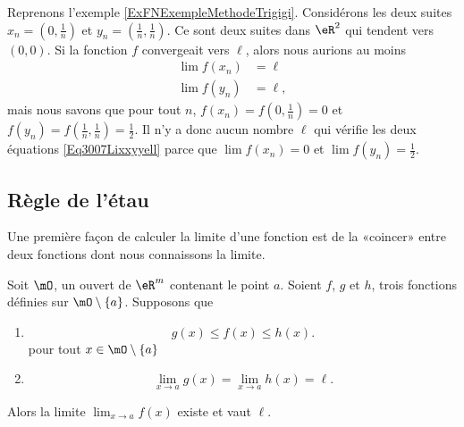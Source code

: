 \begin{example} \label{EXooNBTYooFyKRTB}
	Reprenons l'exemple \ref{ExFNExempleMethodeTrigigi}. Considérons les deux suites \( x_n=(0,\frac{1}{ n })\) et \( y_n=(\frac{1}{ n },\frac{1}{ n })\). Ce sont deux suites dans \( \eR^2\) qui tendent vers \( (0,0)\). Si la fonction \( f\) convergeait vers \( \ell\), alors nous aurions au moins
	\begin{subequations}\label{Eq3007Lixxyyell}
		\begin{align}
			\lim f(x_n) & =\ell  \\
			\lim f(y_n) & =\ell,
		\end{align}
	\end{subequations}
	mais nous savons que pour tout \( n\), \( f(x_n)=f(0,\frac{1}{ n })=0\) et \( f(y_n)=f(\frac{1}{ n },\frac{1}{ n })=\frac{1}{ 2 }\). Il n'y a donc aucun nombre \( \ell\) qui vérifie les deux équations \eqref{Eq3007Lixxyyell} parce que \( \lim f(x_n)=0\) et \( \lim f(y_n)=\frac{ 1 }{2}\).
\end{example}

\subsection{Règle de l'étau}

Une première façon de calculer la limite d'une fonction est de la «coincer» entre deux fonctions dont nous connaissons la limite.
\begin{theorem}		\label{ThoRegleEtau}
	Soit \( \mO\), un ouvert de \( \eR^m\) contenant le point \( a\). Soient \( f\), \( g\) et \( h\), trois fonctions définies sur \( \mO\setminus\{ a \}\). Supposons que
	\begin{enumerate}
		\item
		      \begin{equation}
			      g(x)\leq f(x)\leq h(x).
		      \end{equation}
		      pour tout \( x\in\mO\setminus\{ a \}\)
		\item
		      \begin{equation}
			      \lim_{x\to a} g(x)=\lim_{x\to a} h(x)=\ell.
		      \end{equation}
	\end{enumerate}
	Alors la limite \( \lim_{x\to a} f(x)\) existe et vaut \( \ell\).
\end{theorem}

